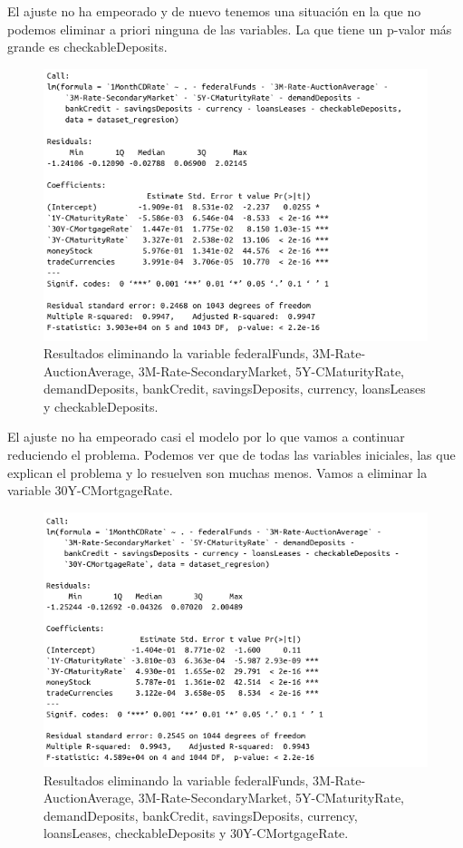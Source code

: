 \documentclass[12pt,a4paper]{article}
\begin{document}
El ajuste no ha empeorado y de nuevo tenemos una situación en la que no podemos eliminar a priori ninguna de las variables. La que tiene un p-valor más grande es checkableDeposits.

\begin{figure}[H]
	\centering 
	\includegraphics[scale=0.6]{./Imagenes/Regresion/regresion_multiple11.png}
	\caption{Resultados eliminando la variable federalFunds, 3M-Rate-AuctionAverage, 3M-Rate-SecondaryMarket, 5Y-CMaturityRate, demandDeposits, bankCredit, savingsDeposits, currency, loansLeases y checkableDeposits.}
\end{figure}

El ajuste no ha empeorado casi el modelo por lo que vamos a continuar reduciendo el problema. Podemos ver que de todas las variables iniciales, las que explican el problema y lo resuelven son muchas menos. Vamos a eliminar la variable 30Y-CMortgageRate.

\begin{figure}[H]
	\centering 
	\includegraphics[scale=0.6]{./Imagenes/Regresion/regresion_multiple12.png}
	\caption{Resultados eliminando la variable federalFunds, 3M-Rate-AuctionAverage, 3M-Rate-SecondaryMarket, 5Y-CMaturityRate, demandDeposits, bankCredit, savingsDeposits, currency, loansLeases, checkableDeposits y 30Y-CMortgageRate.}
\end{figure}
\end{document}
